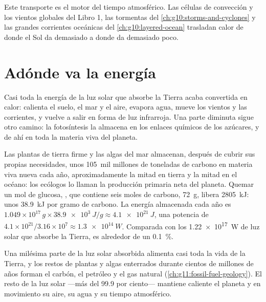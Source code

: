 Este transporte es el motor del tiempo atmosférico. Las células de
convección y los vientos globales del Libro 1, las tormentas del
\cref{ch:g10:storms-and-cyclones} y las grandes corrientes oceánicas del
\cref{ch:g10:layered-ocean} trasladan calor de donde el Sol da demasiado a
donde da demasiado poco.

\section{Adónde va la energía}

Casi toda la energía de la luz solar que absorbe la Tierra acaba
convertida en calor: calienta el suelo, el mar y el aire, evapora agua, mueve
los vientos y las corrientes, y vuelve a salir en forma de luz infrarroja.
Una parte diminuta sigue otro camino: la fotosíntesis la almacena en los
enlaces químicos de los azúcares, y de ahí en toda la materia viva del
planeta.

\begin{example}\label{ex:g10:earth-energy-budget:photosynthesis}
Las plantas de tierra firme y las algas del mar almacenan, después de cubrir
sus propias necesidades, unos \num{105}~mil millones de toneladas de carbono
en materia viva nueva cada año, aproximadamente la mitad en tierra y la mitad
en el océano: los ecólogos lo llaman la producción primaria neta del
planeta. Quemar un mol de glucosa, , que contiene seis moles de
carbono, \qty{72}{g}, libera \qty{2805}{kJ}: unos \qty{38.9}{kJ} por gramo de
carbono. La energía almacenada cada año es
$1.049\times10^{17}\,\unit{g} \times \qty{38.9e3}{J/g} \approx
\qty{4.1e21}{J}$, una potencia de $4.1\times10^{21}/3.16\times10^{7} \approx
\qty{1.3e14}{W}$. Comparada con los \qty{1.22e17}{W} de luz solar que absorbe
la Tierra, es alrededor de un \qty{0.1}{\percent}.
\end{example}

\begin{remark}\label{rem:g10:earth-energy-budget:life}
Una milésima parte de la luz solar absorbida alimenta casi toda la vida de la
Tierra, y los restos de plantas y algas enterrados durante cientos de
millones de años forman el carbón, el petróleo y el gas natural
(\cref{ch:g11:fossil-fuel-geology}). El resto de la luz solar ---más del 99.9
por ciento--- mantiene caliente el planeta y en movimiento su aire, su agua y
su tiempo atmosférico.
\end{remark}


